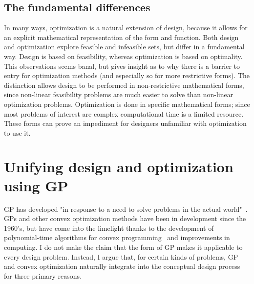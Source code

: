 \subsection{The fundamental differences}

In many ways, optimization is a natural extension of design, because it allows
for an explicit mathematical representation of the form and function. Both design and
optimization explore feasible and infeasible sets, but differ in a fundamental way.
Design is based on feasibility, whereas optimization is based on optimality.
This observations seems banal, but gives insight as to why there is a barrier
to entry for optimization methods (and especially so for more restrictive forms).
The distinction allows design to be performed
in non-restrictive mathematical forms, since non-linear feasibility problems are
much easier to solve than non-linear optimization problems. Optimization is
done in specific mathematical forms; since most problems of interest are complex
computational time is a limited resource. These forms can prove
an impediment for designers unfamiliar with optimization to use it.

\section{Unifying design and optimization using GP}

\gls{GP} has developed "in response to a need to solve problems in the actual 
world"~\cite{duffingp}. \gls{GP}s and other convex optimization methods have been
in development since the 1960's, but have come into the limelight thanks to the development of
polynomial-time algorithms for convex programming~\cite{interior_point} and
improvements in computing. I do not make
the claim that the form of \gls{GP} makes it applicable to every design
problem. Instead, I argue that, for certain kinds of problems, \gls{GP} and convex
optimization naturally integrate into the conceptual design process
for three primary reasons.

